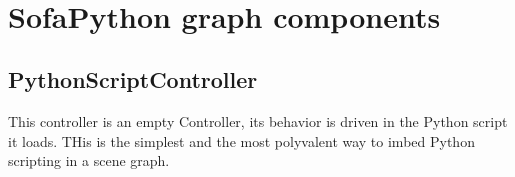 \
\section{SofaPython graph components}

\subsection{PythonScriptController}
This controller is an empty Controller, its behavior is driven in the Python script it loads. THis is the simplest and the most polyvalent way to imbed Python scripting in a \sofa scene graph. 

   
